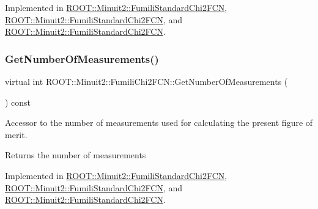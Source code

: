 Implemented in \mbox{\hyperlink{classROOT_1_1Minuit2_1_1FumiliStandardChi2FCN_a27414beb35c9c18156e6b3781aaf587f}{R\+O\+O\+T\+::\+Minuit2\+::\+Fumili\+Standard\+Chi2\+F\+CN}}, \mbox{\hyperlink{classROOT_1_1Minuit2_1_1FumiliStandardChi2FCN_a868b7c1aa7d2597db475ca99799c9131}{R\+O\+O\+T\+::\+Minuit2\+::\+Fumili\+Standard\+Chi2\+F\+CN}}, and \mbox{\hyperlink{classROOT_1_1Minuit2_1_1FumiliStandardChi2FCN_a868b7c1aa7d2597db475ca99799c9131}{R\+O\+O\+T\+::\+Minuit2\+::\+Fumili\+Standard\+Chi2\+F\+CN}}.

\mbox{\label{classROOT_1_1Minuit2_1_1FumiliChi2FCN_afa1acb8484d1c1825de0dd641e301717}} 
\subsubsection{\texorpdfstring{GetNumberOfMeasurements()}{GetNumberOfMeasurements()}\hspace{0.1cm}{\footnotesize\ttfamily [2/3]}}
{\footnotesize\ttfamily virtual int R\+O\+O\+T\+::\+Minuit2\+::\+Fumili\+Chi2\+F\+C\+N\+::\+Get\+Number\+Of\+Measurements (\begin{DoxyParamCaption}{ }\end{DoxyParamCaption}) const\hspace{0.3cm}{\ttfamily [pure virtual]}}

Accessor to the number of measurements used for calculating the present figure of merit.

\begin{DoxyReturn}{Returns}
the number of measurements 
\end{DoxyReturn}


Implemented in \mbox{\hyperlink{classROOT_1_1Minuit2_1_1FumiliStandardChi2FCN_a27414beb35c9c18156e6b3781aaf587f}{R\+O\+O\+T\+::\+Minuit2\+::\+Fumili\+Standard\+Chi2\+F\+CN}}, \mbox{\hyperlink{classROOT_1_1Minuit2_1_1FumiliStandardChi2FCN_a868b7c1aa7d2597db475ca99799c9131}{R\+O\+O\+T\+::\+Minuit2\+::\+Fumili\+Standard\+Chi2\+F\+CN}}, and \mbox{\hyperlink{classROOT_1_1Minuit2_1_1FumiliStandardChi2FCN_a868b7c1aa7d2597db475ca99799c9131}{R\+O\+O\+T\+::\+Minuit2\+::\+Fumili\+Standard\+Chi2\+F\+CN}}.

\mbox{\label{classROOT_1_1Minuit2_1_1FumiliChi2FCN_afa1acb8484d1c1825de0dd641e301717}} 
